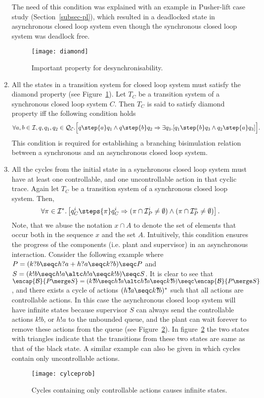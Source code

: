 \documentclass[a4paper,english,final]{article}
\theoremstyle{plain}
\theoremstyle{definition}
\newcommand{\com}{\ensuremath{?\mkern-6mu!}}
\newcommand{\hide}{\ensuremath{\mathcal{I}}}
\newcommand{\block}{\ensuremath{\mathcal{B}}}
\begin{document}
\begin{enumerate}
    The need of this condition was explained with an example in Pusher-lift case study (Section~\ref{subsec-pl}), which resulted in a deadlocked state in asynchronous closed loop system even though the synchronous closed loop system was deadlock free.
\begin{figure}\centering
\texttt{[image: diamond]}
\caption{Important property for desynchronisability.}\label{diamond-fig}
\end{figure}
\item All the states in a transition system for closed loop system must satisfy the diamond property (see Figure~\ref{diamond-fig}). Let $T_{C}$ be a transition system of a synchronous closed loop system $C$. Then $T_C$ is said to satisfy diamond property iff the following condition holds\begin{eqnarray*}
     \forall a,b\in\hide,q,q_1,q_2\in\mathcal{Q_C}.\Big[q\step{a}q_1\wedge q\step{b}q_2\Rightarrow \exists q_3.[q_1\step{b}q_3 \wedge q_2\step{a}q_3]\Big].\end{eqnarray*} This condition is required for establishing a branching bisimulation relation between a synchronous and an asynchronous closed loop system.
\item All the cycles from the initial state in a synchronous closed loop system must have at least one controllable, and one uncontrollable action in that cyclic trace. Again let $T_C$ be a transition system of a synchronous closed loop system. Then, \[\forall \pi\in\hide^{*}.\left[q^i_C\steps{\pi}q^i_C \Rightarrow (\pi\cap\hide_{P}^i\neq\emptyset)\wedge(\pi\cap\hide_{P}^o\neq\emptyset)\right].\]
Note, that we abuse the notation $x \cap A$ to denote the set of elements that occur both in the sequence $x$ and the set $A$. Intuitively, this condition ensures the progress of the components (i.e. plant and supervisor) in an asynchronous interaction. Consider the following example where $P=(k?b\seqc h?a + h?a\seqc k?b)\seqc P$ and $S=(k!b\seqc h!a\altc h!a\seqc k!b)\seqc S$. It is clear to see that $\encap{\block}{P\merge S}=(k\com b\seqc h\com a\altc h\com a\seqc k\com b)\seqc\encap{\block}{P\merge S}$, and there exists a cycle of actions $(h\com a\seqc k\com b)^{*}$ such that all actions are controllable actions. In this case the asynchronous closed loop system will have infinite states because supervisor $S$ can always send the controllable actions $k!b$, or $h!a$ to the unbounded queue, and the plant can wait forever to remove these actions from the queue (see Figure~\ref{cycleprob}). In figure~\ref{cycleprob} the two states with triangles indicate that the transitions from these two states are same as that of the black state. A similar example can also be given in which cycles contain only uncontrollable actions.
\begin{figure}\centering
\texttt{[image: cylceprob]}
\caption{Cycles containing only controllable actions causes infinite states.}\label{cycleprob}
\end{figure}
\end{enumerate}
\end{document}
